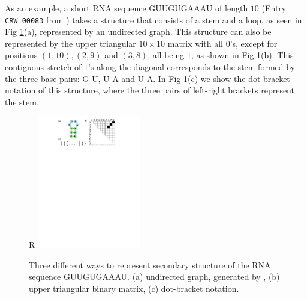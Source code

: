 \documentclass{article}
\begin{document}
As an example, a short RNA sequence GUUGUGAAAU of length $10$ (Entry \verb|CRW_00083| from \cite{andronescu2008rna}) takes a structure that
consists of a stem and a loop, as seen in Fig \ref{fig:rna_ss_binary_mat}(a), represented by an undirected graph.
This structure can also be represented by the upper triangular $10 \times 10$ matrix with all $0$'s,
except for positions
$(1, 10), (2, 9)$ and $(3, 8)$,
all being $1$, as shown in Fig \ref{fig:rna_ss_binary_mat}(b).
This contiguous stretch of $1$'s along the diagonal corresponds to the stem formed by the three base pairs: G-U, U-A and U-A.
In Fig \ref{fig:rna_ss_binary_mat}(c) we show the dot-bracket notation of this structure, where the three pairs
of left-right brackets represent the stem.


\begin{figure}{R}
        \centering
        \includegraphics[width=0.4\textwidth]{plot/rna_ss_binary_mat.pdf}
        \caption{Three different ways to represent secondary structure of the RNA sequence GUUGUGAAAU. (a) undirected graph, generated by \cite{kerpedjiev2015forna}, (b) upper triangular binary matrix, (c) dot-bracket notation.}
        \label{fig:rna_ss_binary_mat}
        \centering
\end{figure}

\end{document}

